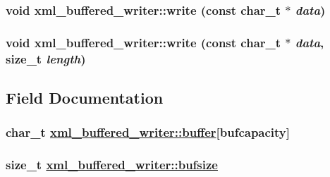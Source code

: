 \hypertarget{classxml__buffered__writer_f4181dcf2610619ba4f35d86c3d66372}{
\subsubsection[write]{\setlength{\rightskip}{0pt plus 5cm}void xml\_\-buffered\_\-writer::write (const char\_\-t $\ast$ {\em data})}}
\label{classxml__buffered__writer_f4181dcf2610619ba4f35d86c3d66372}


\hypertarget{classxml__buffered__writer_f830f04deffd7e28122d8c8973707c94}{
\subsubsection[write]{\setlength{\rightskip}{0pt plus 5cm}void xml\_\-buffered\_\-writer::write (const char\_\-t $\ast$ {\em data}, size\_\-t {\em length})}}
\label{classxml__buffered__writer_f830f04deffd7e28122d8c8973707c94}




\subsection{Field Documentation}
\hypertarget{classxml__buffered__writer_84c87765fbdf444d981ffb0f67899dd4}{
\subsubsection[buffer]{\setlength{\rightskip}{0pt plus 5cm}char\_\-t \hyperlink{classxml__buffered__writer_84c87765fbdf444d981ffb0f67899dd4}{xml\_\-buffered\_\-writer::buffer}\mbox{[}bufcapacity\mbox{]}}}
\label{classxml__buffered__writer_84c87765fbdf444d981ffb0f67899dd4}


\hypertarget{classxml__buffered__writer_6bad6a93035d796939d84bee30e74ce7}{
\subsubsection[bufsize]{\setlength{\rightskip}{0pt plus 5cm}size\_\-t \hyperlink{classxml__buffered__writer_6bad6a93035d796939d84bee30e74ce7}{xml\_\-buffered\_\-writer::bufsize}}}
\label{classxml__buffered__writer_6bad6a93035d796939d84bee30e74ce7}


